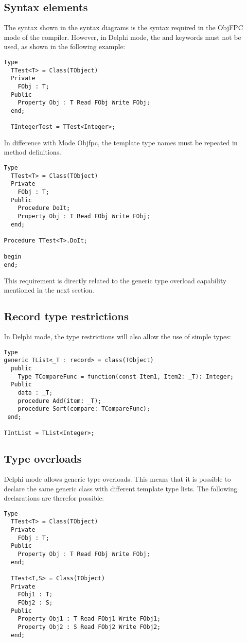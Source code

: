 \subsection{Syntax elements}
The syntax shown in the syntax diagrams is the syntax required in the ObjFPC mode of the compiler.
However, in Delphi mode, the  and  keywords must not be used, as shown in the following example:
\begin{verbatim}
Type
  TTest<T> = Class(TObject)
  Private
    FObj : T;
  Public
    Property Obj : T Read FObj Write FObj;
  end;

  TIntegerTest = TTest<Integer>;
\end{verbatim}
In difference with Mode Objfpc, the template type names must be repeated in method definitions. 
\begin{verbatim}
Type
  TTest<T> = Class(TObject)
  Private
    FObj : T;
  Public
    Procedure DoIt;
    Property Obj : T Read FObj Write FObj;
  end;

Procedure TTest<T>.DoIt;

begin
end;
\end{verbatim}
This requirement is directly related to the generic type overload capability mentioned in the next section.

\subsection{Record type restrictions}
In Delphi mode, the  type restrictions will also allow the use of simple types:
\begin{verbatim}
Type
generic TList<_T : record> = class(TObject)
  public 
    Type TCompareFunc = function(const Item1, Item2: _T): Integer;
  Public  
    data : _T;
    procedure Add(item: _T);
    procedure Sort(compare: TCompareFunc);
 end;

TIntList = TList<Integer>;
\end{verbatim}

\subsection{Type overloads}
Delphi mode allows generic type overloads. This means that it is possible to declare the same generic class
with different template type lists. The following declarations are therefor possible:
\begin{verbatim}
Type
  TTest<T> = Class(TObject)
  Private
    FObj : T;
  Public
    Property Obj : T Read FObj Write FObj;
  end;

  TTest<T,S> = Class(TObject)
  Private
    FObj1 : T;
    FObj2 : S;
  Public
    Property Obj1 : T Read FObj1 Write FObj1;
    Property Obj2 : S Read FObj2 Write FObj2;
  end;
\end{verbatim}

